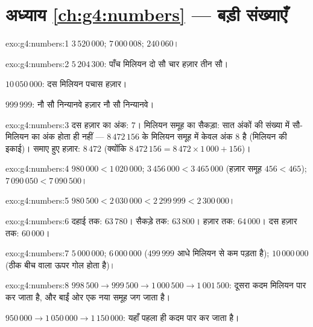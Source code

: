 \section*{अध्याय \ref{ch:g4:numbers} --- बड़ी संख्याएँ}

\begin{solution}{exo:g4:numbers:1}
$3\,520\,000$; \quad $7\,000\,008$; \quad $240\,060$।
\end{solution}

\begin{solution}{exo:g4:numbers:2}
$5\,204\,300$: पाँच मिलियन दो सौ चार हज़ार तीन सौ।

$10\,050\,000$: दस मिलियन पचास हज़ार।

$999\,999$: नौ सौ निन्यानवे हज़ार नौ सौ
निन्यानवे।
\end{solution}

\begin{solution}{exo:g4:numbers:3}
दस हज़ार का अंक: $7$। मिलियन समूह का सैकड़ा: सात अंकों की संख्या
में सौ-मिलियन का अंक होता ही नहीं --- $8\,472\,156$ के मिलियन
समूह में केवल अंक $8$ है (मिलियन की इकाई)। समाए हुए हज़ार:
$8\,472$ (क्योंकि
$8\,472\,156 = 8\,472 \times 1\,000 + 156$)।
\end{solution}

\begin{solution}{exo:g4:numbers:4}
$980\,000 < 1\,020\,000$; \quad
$3\,456\,000 < 3\,465\,000$ (हज़ार समूह $456 < 465$); \quad
$7\,090\,050 < 7\,090\,500$।
\end{solution}

\begin{solution}{exo:g4:numbers:5}
$980\,500 < 2\,030\,000 < 2\,299\,999 < 2\,300\,000$।
\end{solution}

\begin{solution}{exo:g4:numbers:6}
दहाई तक: $63\,780$। सैकड़े तक: $63\,800$। हज़ार तक:
$64\,000$। दस हज़ार तक: $60\,000$।
\end{solution}

\begin{solution}{exo:g4:numbers:7}
$5\,000\,000$; \quad $6\,000\,000$ ($499\,999$ आधे मिलियन से
कम पड़ता है); \quad $10\,000\,000$ (ठीक बीच वाला ऊपर गोल होता है)।
\end{solution}

\begin{solution}{exo:g4:numbers:8}
$998\,500 \to 999\,500 \to 1\,000\,500 \to 1\,001\,500$: दूसरा
कदम मिलियन पार कर जाता है, और बाईं ओर एक नया समूह जग जाता है।

$950\,000 \to 1\,050\,000 \to 1\,150\,000$: यहाँ पहला ही कदम पार
कर जाता है।
\end{solution}

